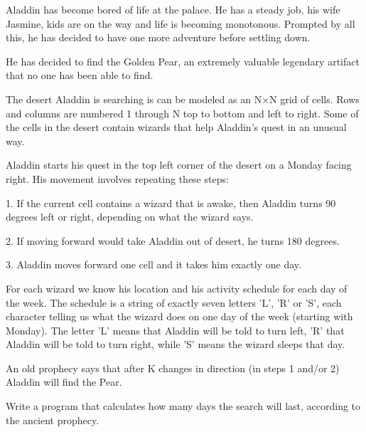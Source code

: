 Aladdin has become bored of life at the palace. He has a steady job, his wife Jasmine, kids are on the way and life is becoming monotonous. Prompted by all this, he has decided to have one more adventure before settling down.  

   He has decided to find the Golden Pear, an extremely valuable legendary artifact that no one has been able to find.  

   The desert Aladdin is searching is can be modeled as an N×N grid of cells. Rows and columns are numbered 1 through N top to bottom and left to right. Some of the cells in the desert contain wizards that help Aladdin's quest in an unusual way.  

   Aladdin starts his quest in the top left corner of the desert on a Monday facing right. His movement involves repeating these steps:  
\begin{itemize}

    1. If the current cell contains a wizard that is awake, then Aladdin turns 90 degrees left or right, depending on what the wizard says.   

    2. If moving forward would take Aladdin out of desert, he turns 180 degrees.   

    3. Aladdin moves forward one cell and it takes him exactly one day.   
\end{itemize}

   For each wizard we know his location and his activity schedule for each day of the week. The schedule is a string of exactly seven letters 'L', 'R' or 'S', each character telling us what the wizard does on one day of the week (starting with Monday). The letter 'L' means that Aladdin will be told to turn left, 'R' that Aladdin will be told to turn right, while 'S' means the wizard sleeps that day.  

   An old prophecy says that after K changes in direction (in steps 1 and/or 2) Aladdin will find the Pear.  

   Write a program that calculates how many days the search will last, according to the ancient prophecy.